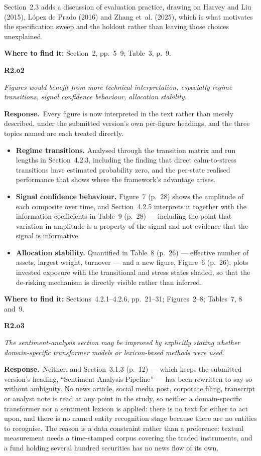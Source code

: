 \documentclass[11pt,a4paper]{article}
\newcommand{\rc}[2]{%
  \par\medskip\noindent
  \colorbox{qbg}{\parbox{\dimexpr\linewidth-2\fboxsep}{%
  \textbf{#1}\par\smallskip\itshape #2}}\par\nopagebreak}
\newcommand{\resp}{\par\medskip\noindent\textbf{Response.}\ }
\newcommand{\where}[1]{\par\smallskip\noindent\textcolor{blue!55!black}{\textbf{Where to find it:} #1}\par}
\begin{document}
Section~2.3 adds a discussion of evaluation practice, drawing on Harvey and Liu (2015),
López de Prado (2016) and Zhang et~al. (2025), which is what motivates the specification
sweep and the holdout rather than leaving those choices unexplained.
\where{Section~2, pp.~5--9; Table~3, p.~9.}

\rc{R2.o2}{Figures would benefit from more technical interpretation, especially regime
transitions, signal confidence behaviour, allocation stability.}

\resp Every figure is now interpreted in the text rather than merely described, under the
submitted version's own per-figure headings, and the three topics named are each treated
directly.

\begin{itemize}
\item \textbf{Regime transitions.} Analysed through the transition matrix and run lengths
in Section~4.2.3, including the finding that direct calm-to-stress transitions have
estimated probability zero, and the per-state realised performance that shows where the
framework's advantage arises.
\item \textbf{Signal confidence behaviour.} Figure~7 (p.~28) shows the amplitude of each
composite over time, and Section~4.2.5 interprets it together with the information
coefficients in Table~9 (p.~28) --- including the point that variation in amplitude is a
property of the signal and not evidence that the signal is informative.
\item \textbf{Allocation stability.} Quantified in Table~8 (p.~26) --- effective number of
assets, largest weight, turnover --- and a new figure, Figure~6 (p.~26), plots invested
exposure with the transitional and stress states shaded, so that the de-risking mechanism
is directly visible rather than inferred.
\end{itemize}
\where{Sections~4.2.1--4.2.6, pp.~21--31; Figures~2--8; Tables~7, 8 and~9.}

\rc{R2.o3}{The sentiment-analysis section may be improved by explicitly stating whether
domain-specific transformer models or lexicon-based methods were used.}

\resp Neither, and Section~3.1.3 (p.~12) --- which keeps the submitted version's heading,
``Sentiment Analysis Pipeline'' --- has been rewritten to say so without ambiguity. No news
article, social media post, corporate filing, transcript or analyst note is read at any
point in the study, so neither a domain-specific transformer nor a sentiment lexicon is
applied: there is no text for either to act upon, and there is no named entity recognition
stage because there are no entities to recognise. The reason is a data constraint rather
than a preference: textual measurement needs a time-stamped corpus covering the traded
instruments, and a fund holding several hundred securities has no news flow of its own.
\end{document}
